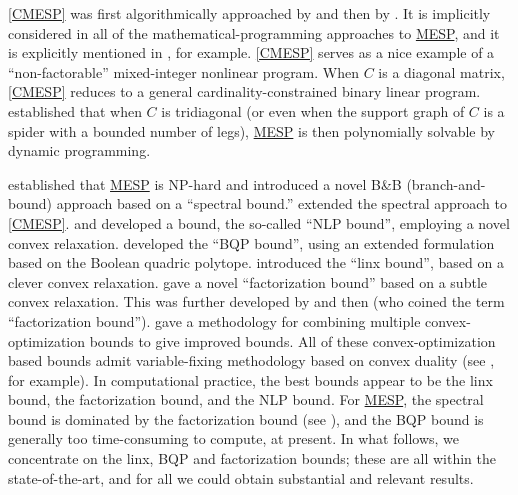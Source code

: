\documentclass[smallextended]{svjour3hack}       %
\newcommand{\zc}[1]{\noindent{\color{red}[Zhongzhu:]\ {#1}}}
\begin{document}
\ref{CMESP} was first algorithmically approached by \cite{LeeConstrained}
and then by \cite{FampaPhD,WilliamsPhD,AFLW_IPCO,AFLW_Using}.
It is implicitly considered in all of the mathematical-programming approaches to \hyperlink{MESP}{MESP}, and it is explicitly
mentioned in \cite{Anstreicher_BQP_entropy,Kurt_linx}, for example.
\ref{CMESP} serves as a nice example of a ``non-factorable''
mixed-integer nonlinear program.
When $C$ is a diagonal matrix,
\ref{CMESP} reduces to a general cardinality-constrained
binary linear program.  \cite{AlThaniLeeTridiag,AlThaniLeeTridiag_journal} established that when $C$ is tridiagonal (or even when the support graph of $C$ is a spider with a bounded number of legs), \hyperlink{MESP}{MESP} is then polynomially solvable
by dynamic programming.

\cite{KLQ} established that \hyperlink{MESP}{MESP} is NP-hard
and introduced a novel B\&B (branch-and-bound) approach
based on a ``spectral bound.'' \cite{LeeConstrained}
extended the spectral approach to \ref{CMESP}.
\cite{AFLW_IPCO}  and \cite{AFLW_Using}
developed a bound, the so-called ``NLP bound'', employing a novel convex relaxation.
\cite{Anstreicher_BQP_entropy} developed the  ``BQP bound'', using an extended formulation based on the Boolean quadric polytope. \cite{Kurt_linx} introduced the ``linx bound'', based on a clever convex relaxation.
\cite{nikolov2015randomized} gave a novel
 ``factorization bound'' based on a subtle convex
 relaxation. This was further developed by \cite{li2020best} and then \cite{chen2023computing} (who coined the term ``factorization bound'').
  \cite{chen_mixing} gave a methodology for combining multiple
 convex-optimization bounds to give improved bounds.
 All of these convex-optimization based bounds admit variable-fixing methodology based on convex duality (see \cite{FLbook}, for example).
In computational  practice, the best bounds appear to be the linx bound, the factorization bound, and the NLP bound.
For \hyperlink{MESP}{MESP}, the spectral bound  is dominated by the factorization bound (see \cite{chen2023computing}), and the
BQP bound is generally too time-consuming to compute, at present.
In what follows, we concentrate on the linx, BQP and factorization bounds; these are all within the state-of-the-art, and for all we could obtain substantial and relevant results.
\end{document}
